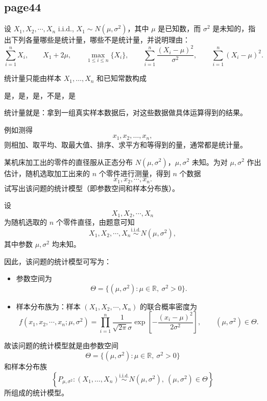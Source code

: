 \subsection*{page44}

\begin{homework}[3]
设 $X_1, X_2, \cdots, X_n$ i.i.d., $X_1 \sim N(\mu,\sigma^2)$，其中 $\mu$ 是已知数，而 $\sigma^2$ 是未知的，指出下列各量哪些是统计量，哪些不是统计量，并说明理由：
\[
\sum_{i=1}^n X_i,\qquad
X_1+2\mu,\qquad
\max_{1\le i\le n}\{X_i\},\qquad
\sum_{i=1}^n \frac{(X_i-\mu)^2}{\sigma^2},\qquad
\sum_{i=1}^n (X_i-\mu)^2.
\]
\end{homework}
\begin{dxtips}
统计量只能由样本 $X_1,\dots,X_n$ 和已知常数构成
\end{dxtips}
\begin{solution}
    是，是，是，不是，是
\end{solution}
\begin{note}
统计量就是：拿到一组真实样本数据后，对这些数据做具体运算得到的结果。

例如测得
\[
x_1,x_2,\dots,x_n,
\]
则相加、取平均、取最大值、排序、求平方和等得到的量，通常都是统计量。
\end{note}
\begin{homework}[4]
某机床加工出的零件的直径服从正态分布 $N(\mu,\sigma^2)$，$\mu,\sigma^2$ 未知。为对 $\mu,\sigma^2$ 作出估计，随机选取加工出来的 $n$ 个零件进行测量，得到 $n$ 个数据
\[
x_1,x_2,\cdots,x_n.
\]
试写出该问题的统计模型（即参数空间和样本分布族）。
\end{homework}
\begin{solution}
设
\[
X_1,X_2,\cdots,X_n
\]
为随机选取的 $n$ 个零件直径，由题意可知
\[
X_1,X_2,\cdots,X_n \overset{\text{i.i.d.}}{\sim} N(\mu,\sigma^2),
\]
其中参数 $\mu,\sigma^2$ 均未知。

因此，该问题的统计模型可写为：
\begin{itemize}
    \item 参数空间为
    \[
    \Theta=\{(\mu,\sigma^2):\mu\in\mathbb{R},\ \sigma^2>0\}.
    \]

    \item 样本分布族为：样本 $(X_1,X_2,\cdots,X_n)$ 的联合概率密度为
    \[
    f(x_1,x_2,\cdots,x_n;\mu,\sigma^2)
    =\prod_{i=1}^n \frac{1}{\sqrt{2\pi}\sigma}
    \exp\!\left[-\frac{(x_i-\mu)^2}{2\sigma^2}\right],
    \qquad (\mu,\sigma^2)\in\Theta.
    \]
\end{itemize}

故该问题的统计模型就是由参数空间
\[
\Theta=\{(\mu,\sigma^2):\mu\in\mathbb{R},\ \sigma^2>0\}
\]
和样本分布族
\[
\left\{
P_{\mu,\sigma^2}:(X_1,\dots,X_n)\overset{\text{i.i.d.}}{\sim}N(\mu,\sigma^2),
\ (\mu,\sigma^2)\in\Theta
\right\}
\]
所组成的统计模型。
\end{solution}
